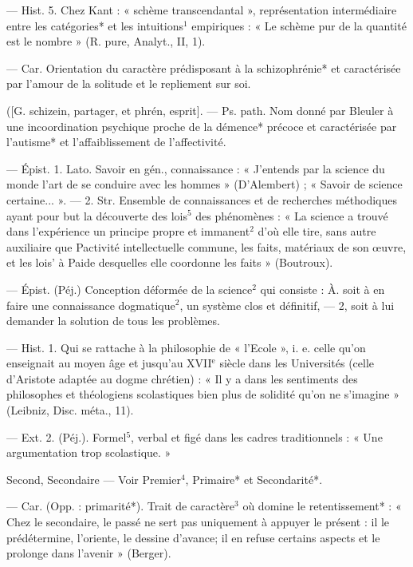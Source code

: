 \begin{itemize}[leftmargin=1cm, label=, itemsep=1pt]
— Hist. 5. Chez Kant : « schème
transcendantal », représentation intermédiaire entre les catégories* et
les intuitions$^1$ empiriques : « Le
schème pur de la quantité est le
nombre » (R. pure, Analyt., II, 1).

 — Car. Orientation du
caractère prédisposant à la schizophrénie* et caractérisée par l’amour
de la solitude et le repliement sur soi.

 ([G. schizein, partager,
et phrén, esprit]. — Ps. path. Nom
donné par Bleuler à une incoordination psychique proche de la démence* précoce et caractérisée par
l'autisme* et l'affaiblissement de
l’affectivité.

 — Épist. 1. Lato. Savoir en
gén., connaissance : « J'entends par
la science du monde l’art de se conduire avec les hommes » (D’Alembert) ; « Savoir de science certaine... ».
— 2. Str. Ensemble de connaissances et de recherches méthodiques ayant pour but la découverte des lois$^5$ des phénomènes : « La
science a trouvé dans l’expérience
un principe propre et immanent$^2$
d’où elle tire, sans autre auxiliaire
que Pactivité intellectuelle commune, les faits, matériaux de son
œuvre, et les lois’ à Paide desquelles
elle coordonne les faits » (Boutroux).

 — Épist. (Péj.) Conception déformée de la science$^2$ qui
consiste : À. soit à en faire une connaissance dogmatique$^2$, un système
clos et définitif, — 2, soit à lui
demander la solution de tous les
problèmes.

 — Hist. 1. Qui se rattache
à la philosophie de « l'Ecole », i. e.
celle qu'on enseignait au moyen
âge et jusqu'au {\footnotesize XVII}$^\text{e}$ siècle dans les
Universités (celle d’Aristote adaptée
au dogme chrétien) : « Il y a dans
les sentiments des philosophes et
théologiens scolastiques bien plus de
solidité qu'on ne s'imagine » (Leibniz, Disc. méta., 11).

— Ext. 2. (Péj.). Formel$^5$, verbal
et figé dans les cadres traditionnels :
« Une argumentation trop scolastique. »

Second, Secondaire\ib{} — Voir Premier$^4$,
Primaire* et Secondarité*.

 — Car. (Opp. : primarité*). Trait de caractère$^3$ où domine
le retentissement* : « Chez le secondaire, le passé ne sert pas uniquement à appuyer le présent : il le
prédétermine, l’oriente, le dessine
d'avance; il en refuse certains
aspects et le prolonge dans l’avenir »
(Berger).


\end{itemize}
